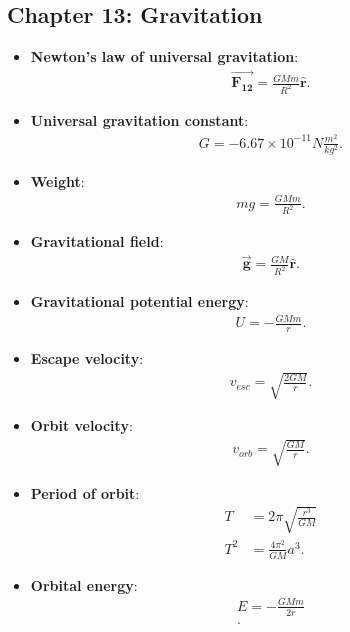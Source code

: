 \documentclass{report}
\begin{document}
    \pagebreak 
    \subsection{Chapter 13: Gravitation}
    \begin{itemize}
        \item \textbf{Newton's law of universal gravitation}:
            \begin{align*}
                \vec{\mathbf{F_{12}}} = \frac{GMm}{R^{2}}\hat{\mathbf{r}}
            .\end{align*}
        \item \textbf{Universal gravitation constant}:
            \begin{align*}
               G = -6.67 \times 10^{-11} N \frac{m^{2}}{kg^{2}} 
            .\end{align*}
        \item \textbf{Weight}:
            \begin{align*}
                mg = \frac{GMm}{R^{2}}
            .\end{align*}
        \item \textbf{Gravitational field}:
            \begin{align*}
                \vec{\mathbf{g}} = \frac{GM}{R^{2}}\hat{\mathbf{r}}
            .\end{align*}
        \item \textbf{Gravitational potential energy}:
            \begin{align*}
                U = -\frac{GMm}{r}
            .\end{align*}
        \item \textbf{Escape velocity}:
            \begin{align*}
                v_{esc} = \sqrt{\frac{2GM}{r}}
            .\end{align*}
        \item \textbf{Orbit velocity}:
            \begin{align*}
                v_{orb} = \sqrt{\frac{GM}{r}}
            .\end{align*}
        \item \textbf{Period of orbit}:
            \begin{align*}
                T &= 2\pi\sqrt{\frac{r^{3}}{GM}} \\
                T^{2} &=\frac{4\pi^{2}}{GM}a^{3} 
            .\end{align*}
        \item \textbf{Orbital energy}:
            \begin{align*}
                E = -\frac{GMm}{2r} \\
            .\end{align*}

    \end{itemize}
\end{document}
